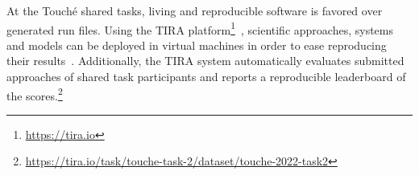 At the Touché shared tasks, living and reproducible software is favored over generated run files.
Using the TIRA platform\footnote{\url{https://tira.io}}~\cite{PotthastGWS2019}, scientific approaches, systems and models can be deployed in virtual machines in order to ease reproducing their results~\cite{PotthastGWS2019}.
Additionally, the TIRA system automatically evaluates submitted approaches of shared task participants and reports a reproducible leaderboard of the  scores.\footnote{\url{https://tira.io/task/touche-task-2/dataset/touche-2022-task2}}

